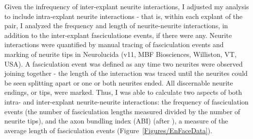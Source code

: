 Given the infrequency of inter-explant neurite interactions, I adjusted my analysis to include intra-explant neurite interactions - that is, within each explant of the pair, I analyzed the frequency and length of neurite-neurite interactions, in addition to the inter-explant fasciculatione events, if there were any.
Neurite interactions were quantified by manual tracing of fasciculation events and marking of neurite tips in Neurolucida (v11, MBF Biosciences, Williston, VT, USA).
A fasciculation event was defined as any time two neurites were observed joining together - the length of the interaction was traced until the neurites could be seen splitting apart or one or both neurites ended.
All discernable neurite endings, or tips, were marked.
Thus, I was able to calculate two aspects of both intra- and inter-explant neurite-neurite interactions: the frequency of fasciculation events (the number of fasciculation lengths measured divided by the number of neurite tips), and the axon bundling index (ABI) (after ), a measure of the average length of fasciculation events (Figure~\ref{Figures/EnFaceData}).
